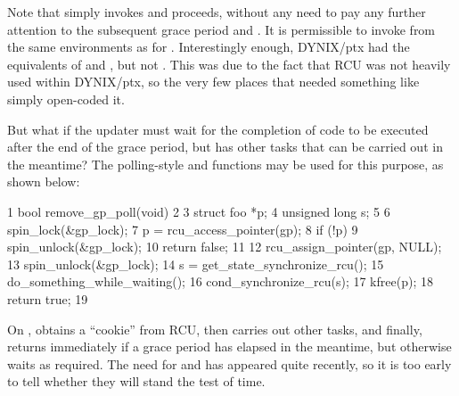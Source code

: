 Note that  simply invokes  and
proceeds, without any need to pay any further attention to the
subsequent grace period and .
It is permissible to invoke
 from the same environments as for .
Interestingly enough, DYNIX/ptx had the equivalents of 
and , but not .
This was due to the
fact that RCU was not heavily used within DYNIX/ptx, so the very few
places that needed something like  simply
open-coded it.

\QuickQuizEnd

But what if the updater must wait for the completion of code to be
executed after the end of the grace period, but has other tasks that can
be carried out in the meantime? The polling-style
 and  functions
may be used for this purpose, as shown below:

\begin{VerbatimN}
       1 bool remove_gp_poll(void)
       2 {
       3   struct foo *p;
       4   unsigned long s;
       5
       6   spin_lock(&gp_lock);
       7   p = rcu_access_pointer(gp);
       8   if (!p) {
       9     spin_unlock(&gp_lock);
      10     return false;
      11   }
      12   rcu_assign_pointer(gp, NULL);
      13   spin_unlock(&gp_lock);
      14   s = get_state_synchronize_rcu();
      15   do_something_while_waiting();
      16   cond_synchronize_rcu(s);
      17   kfree(p);
      18   return true;
      19 }
\end{VerbatimN}

On \clnref{}, %
 obtains a ``cookie'' from RCU,
then \clnref{} %
carries out other tasks, and finally, \clnref{} %
returns
immediately if a grace period has elapsed in the meantime, but otherwise
waits as required.
The need for  and
 has appeared quite recently, so it is too
early to tell whether they will stand the test of time.

